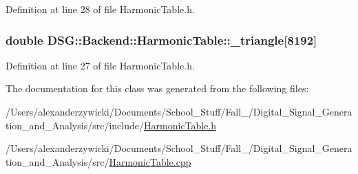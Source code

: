 Definition at line 28 of file Harmonic\+Table.\+h.

\hypertarget{classDSG_1_1Backend_1_1HarmonicTable_a70d00f8d0ad9a244ebf4a8784a69ec33}{
\subsubsection[{\+\_\+triangle}]{\setlength{\rightskip}{0pt plus 5cm}double D\+S\+G\+::\+Backend\+::\+Harmonic\+Table\+::\+\_\+triangle\mbox{[}8192\mbox{]}\hspace{0.3cm}{\ttfamily [protected]}}}\label{classDSG_1_1Backend_1_1HarmonicTable_a70d00f8d0ad9a244ebf4a8784a69ec33}


Definition at line 27 of file Harmonic\+Table.\+h.



The documentation for this class was generated from the following files\+:\begin{DoxyCompactItemize}
\item 
/\+Users/alexanderzywicki/\+Documents/\+School\+\_\+\+Stuff/\+Fall\+\_/\+Digital\+\_\+\+Signal\+\_\+\+Generation\+\_\+and\+\_\+\+Analysis/src/include/\hyperlink{HarmonicTable_8h}{Harmonic\+Table.\+h}\item 
/\+Users/alexanderzywicki/\+Documents/\+School\+\_\+\+Stuff/\+Fall\+\_/\+Digital\+\_\+\+Signal\+\_\+\+Generation\+\_\+and\+\_\+\+Analysis/src/\hyperlink{HarmonicTable_8cpp}{Harmonic\+Table.\+cpp}\end{DoxyCompactItemize}
